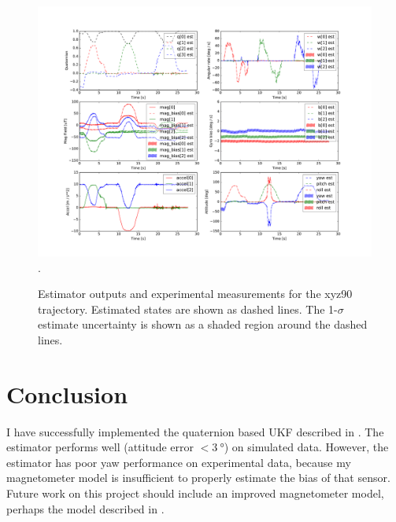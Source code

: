 \documentclass[conference]{IEEEtran}
\begin{document}
\begin{figure}[!t]
  \centering
  \includegraphics[width=7.5in]{figures/est_result_pickle_xyz90.pdf}
  \DeclareGraphicsExtensions.
  \caption{Estimator outputs and experimental measurements for the xyz90 trajectory. Estimated states are shown as dashed lines. The 1-$\sigma$ estimate uncertainty is shown as a shaded region around the dashed lines.}
  \label{fig:est_result_pickle_xyz90}
\end{figure}


\section{Conclusion}
I have successfully implemented the quaternion based UKF described in \cite{1257247}. The estimator performs well (attitude error $< \SI{3}{\degree}$) on simulated data. However, the estimator has poor yaw performance on experimental data, because my magnetometer model is insufficient to properly estimate the bias of that sensor. Future work on this project should include an improved magnetometer model, perhaps the model described in \cite{Crassidis2005}.




\newpage
{}






\end{document}
